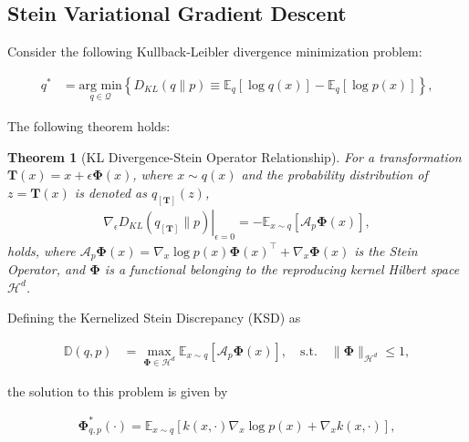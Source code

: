 \documentclass[a4paper,fleqn,10pt,twocolumn]{SICE_ISCS}
\newtheorem{theorem}{Theorem}
\begin{document}
\subsection{Stein Variational Gradient Descent}
Consider the following Kullback-Leibler divergence minimization problem:

\begin{equation}
\begin{aligned}\label{eq:kl_min}
 q^{*}&=\underset{q \in \mathcal{Q}}{\text{arg min}}\left\{D_{KL}(q \| p) \equiv {{\mathbb{E}}}_{q}[\log q(x)]-{{\mathbb{E}}}_{q}[\log {p}(x)] \right\},
\end{aligned}
\end{equation}

The following theorem holds:

\begin{theorem}[KL Divergence-Stein Operator Relationship]
For a transformation ${\boldsymbol{T}}(x)=x+\epsilon {\boldsymbol{\Phi}}(x)$, where $x \sim q(x)$ and the probability distribution of $z={\boldsymbol{T}}(x)$ is denoted as $q_{[{\boldsymbol{T}}]}(z)$,
\begin{equation}
\begin{aligned}\label{eq:kl_gradient}
\left.\nabla_{\epsilon} D_{KL}\left(q_{[{\boldsymbol{T}}]} \| p\right)\right|_{\epsilon=0}=-{{\mathbb{E}}}_{x \sim q}\left[{\mathcal{A}}_{p} {\boldsymbol{\Phi}}(x)\right],
\end{aligned}
\end{equation}
holds, where ${\mathcal{A}}_{p} {\boldsymbol{\Phi}}(x)=\nabla_{x} \log p(x) {\boldsymbol{\Phi}}(x)^{\top}+\nabla_{x} {\boldsymbol{\Phi}}(x)$ is the Stein Operator, and ${\boldsymbol{\Phi}}$ is a functional belonging to the reproducing kernel Hilbert space ${\mathcal{H}}^d$.
\end{theorem}

Defining the Kernelized Stein Discrepancy (KSD) as

\begin{equation}
\begin{aligned}\label{eq:ksd}
{{\mathbb{D}}}(q,p)&=\max_{{\boldsymbol{\Phi}}\in {\mathcal{H}}^d}{{\mathbb{E}}}_{x \sim q}\left[{\mathcal{A}}_{p} {\boldsymbol{\Phi}}(x)\right], 
\quad \text{s.t.} \quad \|{\boldsymbol{\Phi}}\|_{{\mathcal{H}}^d} \leq 1,
\end{aligned}
\end{equation}

the solution to this problem is given by

\begin{equation}
\begin{aligned}\label{eq:phi_solution}
{\boldsymbol{\Phi}}_{q, p}^{*}(\cdot)={{\mathbb{E}}}_{x \sim q}\left[k(x, \cdot) \nabla_{x} \log p(x)+\nabla_{x} k(x, \cdot)\right],
\end{aligned}
\end{equation}
\end{document}

